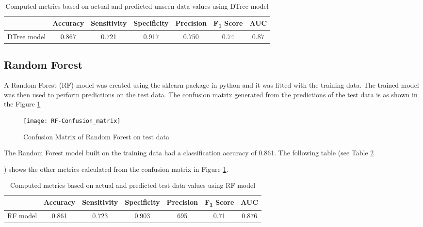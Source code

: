 \documentclass[11pt,openright]{report}
\begin{document}
{\begin{table}[!htbp]
	\renewcommand{\arraystretch}{1.3}
	\caption{Computed metrics based on actual and predicted unseen data values using DTree model}
	\label{table:DTree-unseen_metrics_db}
	\centering
	\begin{tabular}{|c|c|c|c|c|c|c|}
    \hline
  	 & \bfseries Accuracy & \bfseries Sensitivity & \bfseries Specificity & \bfseries Precision & \bfseries F\textsubscript{1} Score  & \bfseries AUC\\  
    \hline
	DTree model & 0.867 & 0.721 & 0.917 & 0.750 & 0.74 & 0.87 \\ \hline
	\end{tabular} 
\end{table}


\subsection {Random Forest}
A Random Forest (RF) model was created using the sklearn package in python and it was fitted with the training data. The trained model was then used to perform predictions on the test data. The confusion matrix generated from the predictions of the test data is as shown in the Figure \ref{fig:RF_confusion_matrix}

  \begin{figure}
	\centering
	\texttt{[image: RF-Confusion\_matrix]}
	\caption{Confusion Matrix of Random Forest on test data}
	\label{fig:RF_confusion_matrix}
\end{figure} 

The Random Forest model built on the training data had a classification accuracy of 0.861. The following table (see Table \ref{table:RF_confusion_matrix}{) shows the other metrics calculated from the confusion matrix in Figure \ref{fig:RF_confusion_matrix}. 
\begin{table}
	\renewcommand{\arraystretch}{1.3}
	\caption{Computed metrics based on actual and predicted test data values using RF model}
	\label{table:RF_confusion_matrix}
	\centering
	\begin{tabular}{|c|c|c|c|c|c|c|}
    \hline
  	 & \bfseries Accuracy & \bfseries Sensitivity & \bfseries Specificity & \bfseries Precision & \bfseries F\textsubscript{1} Score  & \bfseries AUC\\  
    \hline
	RF model & 0.861 & 0.723 & 0.903 & 695 & 0.71 & 0.876 \\ \hline
	\end{tabular} 
\end{table}

}}
\end{document}
